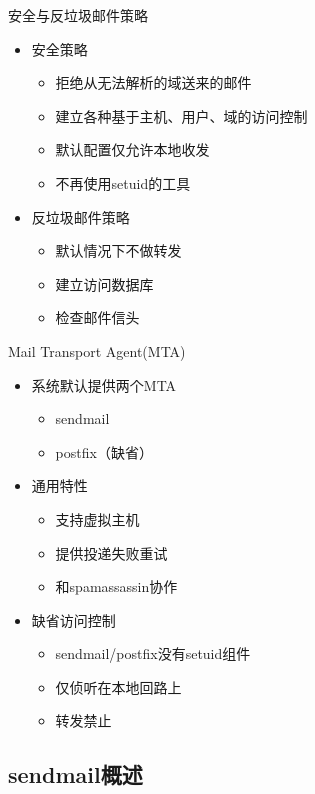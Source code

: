 \begin{frame}{安全与反垃圾邮件策略}
\begin{itemize}
\item 安全策略

\begin{itemize}
\item 拒绝从无法解析的域送来的邮件
\item 建立各种基于主机、用户、域的访问控制
\item 默认配置仅允许本地收发
\item 不再使用setuid的工具
\end{itemize}
\item 反垃圾邮件策略

\begin{itemize}
\item 默认情况下不做转发
\item 建立访问数据库
\item 检查邮件信头
\end{itemize}
\end{itemize}

\end{frame} 
\begin{frame}{Mail Transport Agent(MTA)}
\begin{itemize}
\item 系统默认提供两个MTA

\begin{itemize}
\item sendmail
\item postfix（缺省）
\end{itemize}
\item 通用特性

\begin{itemize}
\item 支持虚拟主机
\item 提供投递失败重试
\item 和spamassassin协作
\end{itemize}
\item 缺省访问控制

\begin{itemize}
\item sendmail/postfix没有setuid组件
\item 仅侦听在本地回路上
\item 转发禁止
\end{itemize}
\end{itemize}

\end{frame} 
\subsection{sendmail概述}

